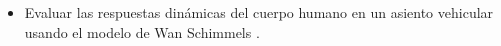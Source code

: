 \begin{itemize}
  \item Evaluar las respuestas dinámicas del cuerpo humano en un asiento vehicular  
    usando el modelo de Wan Schimmels \cite{article}.
\end{itemize}
